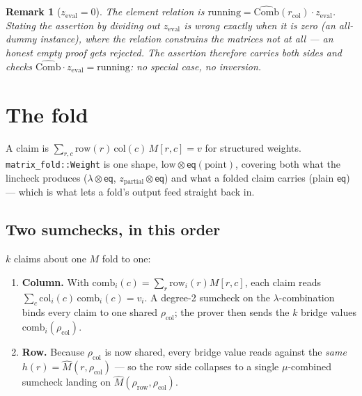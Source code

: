 \documentclass[11pt]{article}
\newcommand{\eq}{\mathsf{eq}}
\newcommand{\code}[1]{\texttt{#1}}
\newtheorem{remark}{Remark}
\theoremstyle{definition}
\begin{document}
\begin{remark}[$z_{\text{eval}} = 0$]
The element relation is $\text{running} = \widehat{\text{Comb}}(r_{\text{col}})
\cdot z_{\text{eval}}$. Stating the assertion by dividing out
$z_{\text{eval}}$ is wrong exactly when it is zero (an all-dummy instance),
where the relation constrains the matrices not at all --- an honest empty
proof gets rejected. The assertion therefore carries both sides and checks
$\widehat{\text{Comb}} \cdot z_{\text{eval}} = \text{running}$: no special
case, no inversion.
\end{remark}

\section{The fold}\label{sec:fold}

A claim is $\sum_{r,c} \text{row}(r)\,\text{col}(c)\,M[r,c] = v$ for
structured weights. \code{matrix\_fold::Weight} is one shape,
$\text{low} \otimes \eq(\text{point})$, covering both what the lincheck
produces ($\lambda \otimes \eq$, $z_{\text{partial}} \otimes \eq$) and what a
folded claim carries (plain $\eq$) --- which is what lets a fold's output
feed straight back in.

\subsection{Two sumchecks, in this order}

$k$ claims about one $M$ fold to one:

\begin{enumerate}[nosep]
  \item \textbf{Column.} With $\text{comb}_i(c) = \sum_r
        \text{row}_i(r) M[r,c]$, each claim reads
        $\sum_c \text{col}_i(c)\,\text{comb}_i(c) = v_i$. A degree-2
        sumcheck on the $\lambda$-combination binds every claim to one
        shared $\rho_{\text{col}}$; the prover then sends the $k$ bridge
        values $\text{comb}_i(\rho_{\text{col}})$.
  \item \textbf{Row.} Because $\rho_{\text{col}}$ is now shared, every
        bridge value reads against the \emph{same}
        $h(r) = \hat M(r, \rho_{\text{col}})$ --- so the row side collapses
        to a single $\mu$-combined sumcheck landing on
        $\hat M(\rho_{\text{row}}, \rho_{\text{col}})$.
\end{enumerate}
\end{document}

